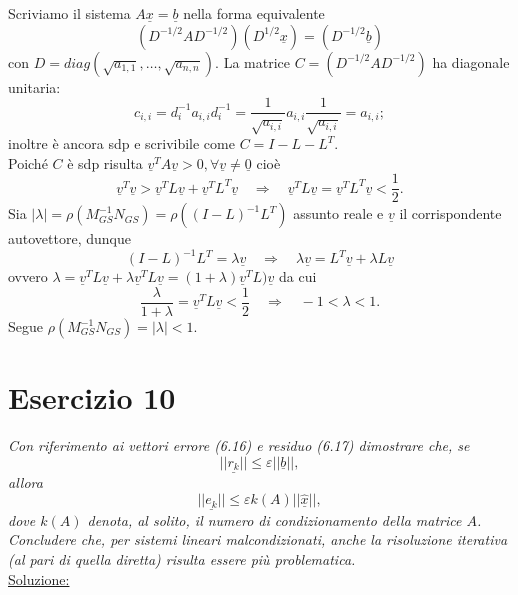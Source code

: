 Scriviamo il sistema $A\underline{x}=\underline{b}$ nella forma equivalente
$$\left(D^{-1/2}AD^{-1/2}\right)\left(D^{1/2}\underline{x}\right)=\left(D^{-1/2}\underline{b}\right)$$
con $D=diag(\sqrt{a_{1,1}},\ldots,\sqrt{a_{n,n}})$. La matrice $C=\left(D^{-1/2}AD^{-1/2}\right)$
ha diagonale unitaria: $$c_{i,i}=d_i^{-1}a_{i,i}d_i^{-1}=\frac{1}{\sqrt{a_{i,i}}}a_{i,i}\frac{1}{\sqrt{a_{i,i}}}=a_{i,i};$$ inoltre è ancora sdp e scrivibile come $C=I-L-L^T$.\\
			Poiché $C$ è sdp risulta $\underline{v}^TA\underline{v}>0, \forall\underline{v}\neq\underline{0}$
      cioè $$\underline{v}^T\underline{v}>\underline{v}^TL\underline{v}+\underline{v}^TL^T\underline{v}\quad\Rightarrow\quad\underline{v}^TL\underline{v}=\underline{v}^TL^T\underline{v}<\frac{1}{2}.$$
			Sia $|\lambda|=\rho(M_{GS}^{-1}N_{GS})=\rho\left((I-L)^{-1}L^T\right)$ assunto reale e $\underline{v}$ il corrispondente autovettore, dunque $$(I-L)^{-1}L^T=\lambda\underline{v}\quad\Rightarrow\quad\lambda\underline{v}=L^T\underline{v}+\lambda L\underline{v}$$
      ovvero $\lambda=\underline{v}^TL\underline{v}+\lambda\underline{v}^TL\underline{v}=(1+\lambda)\underline{v}^TL)\underline{v}$ da cui $$\frac{\lambda}{1+\lambda}=\underline{v}^TL\underline{v}<\frac{1}{2}\quad\Rightarrow\quad -1<\lambda<1.$$
			Segue $\rho(M_{GS}^{-1}N_{GS})=|\lambda|<1$.
\section{Esercizio 10}
\label{sub:es10}
\emph{Con riferimento ai vettori errore (6.16) e residuo (6.17) dimostrare che, se
			\begin{equation}
				\label{criterioArrestoSplitting}
				||\underline{r_k}||\leq\varepsilon||\underline{b}||,
			\end{equation}
			allora
			$$||\underline{e_k}||\leq\varepsilon k(A)||\underline{\hat{x}}||,$$
			dove $k(A)$ denota, al solito, il numero di condizionamento della matrice $A$.
      Concludere che, per sistemi lineari malcondizionati, anche la risoluzione iterativa (al pari di quella diretta) risulta essere più problematica.}\\
\underline{Soluzione:}

